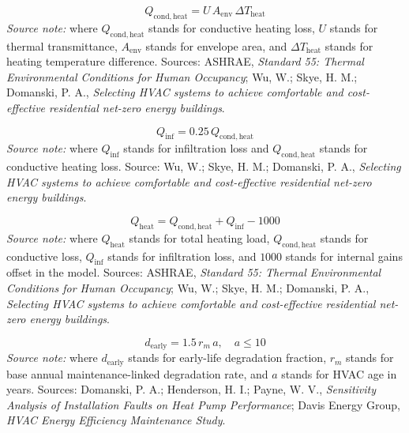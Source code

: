 \documentclass[12pt]{article}
\begin{document}
\begin{equation}
\label{eq:hvac_conduction_heat}
Q_{\mathrm{cond,heat}} = U\,A_{\mathrm{env}}\,\Delta T_{\mathrm{heat}}
\end{equation}
\noindent\textit{Source note:} where $Q_{\mathrm{cond,heat}}$ stands for conductive heating loss, $U$ stands for thermal transmittance, $A_{\mathrm{env}}$ stands for envelope area, and $\Delta T_{\mathrm{heat}}$ stands for heating temperature difference. Sources: ASHRAE, \emph{Standard 55: Thermal Environmental Conditions for Human Occupancy}; Wu, W.; Skye, H. M.; Domanski, P. A., \emph{Selecting HVAC systems to achieve comfortable and cost-effective residential net-zero energy buildings}.

\begin{equation}
\label{eq:hvac_infiltration_heat}
Q_{\mathrm{inf}} = 0.25\,Q_{\mathrm{cond,heat}}
\end{equation}
\noindent\textit{Source note:} where $Q_{\mathrm{inf}}$ stands for infiltration loss and $Q_{\mathrm{cond,heat}}$ stands for conductive heating loss. Source: Wu, W.; Skye, H. M.; Domanski, P. A., \emph{Selecting HVAC systems to achieve comfortable and cost-effective residential net-zero energy buildings}.

\begin{equation}
\label{eq:hvac_total_heating_load}
Q_{\mathrm{heat}} = Q_{\mathrm{cond,heat}} + Q_{\mathrm{inf}} - 1000
\end{equation}
\noindent\textit{Source note:} where $Q_{\mathrm{heat}}$ stands for total heating load, $Q_{\mathrm{cond,heat}}$ stands for conductive loss, $Q_{\mathrm{inf}}$ stands for infiltration loss, and $1000$ stands for internal gains offset in the model. Sources: ASHRAE, \emph{Standard 55: Thermal Environmental Conditions for Human Occupancy}; Wu, W.; Skye, H. M.; Domanski, P. A., \emph{Selecting HVAC systems to achieve comfortable and cost-effective residential net-zero energy buildings}.

\begin{equation}
\label{eq:hvac_degradation_early}
d_{\mathrm{early}} = 1.5\,r_m\,a,\quad a\le 10
\end{equation}
\noindent\textit{Source note:} where $d_{\mathrm{early}}$ stands for early-life degradation fraction, $r_m$ stands for base annual maintenance-linked degradation rate, and $a$ stands for HVAC age in years. Sources: Domanski, P. A.; Henderson, H. I.; Payne, W. V., \emph{Sensitivity Analysis of Installation Faults on Heat Pump Performance}; Davis Energy Group, \emph{HVAC Energy Efficiency Maintenance Study}.
\end{document}
